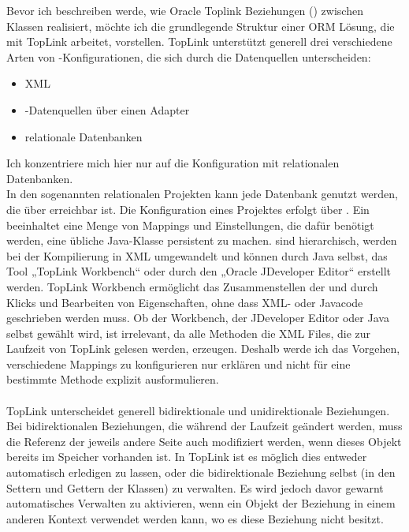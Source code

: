 Bevor ich beschreiben werde, wie Oracle Toplink \cite{toplink-documentation} Beziehungen () zwischen Klassen realisiert, möchte ich die grundlegende Struktur einer ORM Lösung, die mit TopLink arbeitet, vorstellen.
TopLink unterstützt generell drei verschiedene Arten von \ORM-Konfigurationen, die sich durch die Datenquellen unterscheiden: 
\begin{itemize}
\item XML
\item {}-Datenquellen über einen  Adapter
\item relationale Datenbanken
\end{itemize}
Ich konzentriere mich hier nur auf die Konfiguration mit relationalen Datenbanken.\\
In den sogenannten relationalen Projekten kann jede Datenbank genutzt werden, die über  erreichbar ist. Die Konfiguration eines Projektes erfolgt über . Ein  beeinhaltet eine Menge von Mappings und Einstellungen, die dafür benötigt werden, eine übliche Java-Klasse persistent zu machen.  sind hierarchisch, werden bei der Kompilierung in XML umgewandelt und können durch Java selbst, das Tool „TopLink Workbench“ oder durch den „Oracle JDeveloper Editor“ erstellt werden. TopLink Workbench ermöglicht das Zusammenstellen der  und  durch Klicks und Bearbeiten von Eigenschaften, ohne dass XML- oder Javacode geschrieben werden muss. Ob der Workbench, der JDeveloper Editor oder Java selbst gewählt wird, ist irrelevant, da alle Methoden die XML Files, die zur Laufzeit von TopLink gelesen werden, erzeugen. Deshalb werde ich das Vorgehen, verschiedene Mappings zu konfigurieren nur erklären und nicht für eine bestimmte Methode explizit ausformulieren. \\
\\
TopLink unterscheidet generell bidirektionale und unidirektionale Beziehungen. Bei bidirektionalen Beziehungen, die während der Laufzeit geändert werden, muss die Referenz der jeweils andere Seite auch modifiziert werden, wenn dieses Objekt bereits im Speicher vorhanden ist. In TopLink ist es möglich dies entweder automatisch erledigen zu lassen, oder die bidirektionale Beziehung selbst (in den Settern und Gettern der Klassen) zu verwalten. Es wird jedoch davor gewarnt automatisches Verwalten zu aktivieren, wenn ein Objekt der Beziehung in einem anderen Kontext verwendet werden kann, wo es diese Beziehung nicht besitzt.\\
